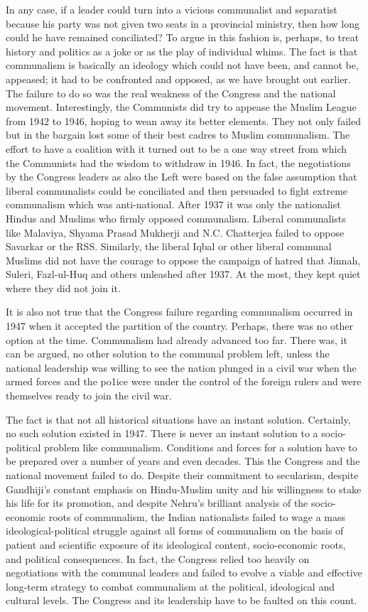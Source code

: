 \begin{multicols}{2}
In any case, if a leader could turn into a vicious communalist and separatist because his party was not given two seats in a provincial ministry, then how long could he have remained conciliated? To argue in this fashion is, perhaps, to treat history and politics as a joke or as the play of individual whims. The fact is that communalism is basically an ideology which could not have been, and cannot be, appeased; it had to be confronted and opposed, as we have brought out earlier. The failure to do so was the real weakness of the Congress and the national movement. Interestingly, the Communists did try to appease the Muslim League from 1942 to 1946, hoping to wean away its better elements. They not only failed but in the bargain lost some of their best cadres to Muslim communalism. The effort to have a coalition with it turned out to be a one way street from which the Communists had the wisdom to withdraw in 1946. In fact, the negotiations by the Congress leaders as also the Left were based on the false assumption that liberal communalists could be conciliated and then persuaded to fight extreme communalism which was anti-national. After 1937 it was only the nationalist Hindus and Muslims who firmly opposed communalism. Liberal communalists like Malaviya, Shyama Prasad Mukherji and N.C. Chatterjea failed to oppose Savarkar or the RSS. Similarly, the liberal Iqbal or other liberal communal Muslims did not have the courage to oppose the campaign of hatred that Jinnah, Suleri, Fazl-ul-Huq and others unleashed after 1937. At the most, they kept quiet where they did not join it. 

It is also not true that the Congress failure regarding communalism occurred in 1947 when it accepted the partition of the country. Perhaps, there was no other option at the time. Communalism had already advanced too far. There was, it can be argued, no other solution to the communal problem left, unless the national leadership was willing to see the nation plunged in a civil war when the armed forces and the po1ice were under the control of the foreign rulers and were themselves ready to join the civil war. 

The fact is that not all historical situations have an instant solution. Certainly, no such solution existed in 1947. There is never an instant solution to a socio-political problem like communalism. Conditions and forces for a solution have to be prepared over a number of years and even decades. This the Congress and the national movement failed to do. Despite their commitment to secularism, despite Gandhiji's constant emphasis on Hindu-Muslim unity and his willingness to stake his life for its promotion, and despite Nehru's brilliant analysis of the socio-economic roots of communalism, the Indian nationalists failed to wage a mass ideological-political struggle against all forms of communalism on the basis of patient and scientific exposure of its ideological content, socio-economic roots, and political consequences. In fact, the Congress relied too heavily on negotiations with the communal leaders and failed to evolve a viable and effective long-term strategy to combat communalism at the political, ideological and cultural levels. The Congress and its leadership have to be faulted on this count.
\end{multicols}